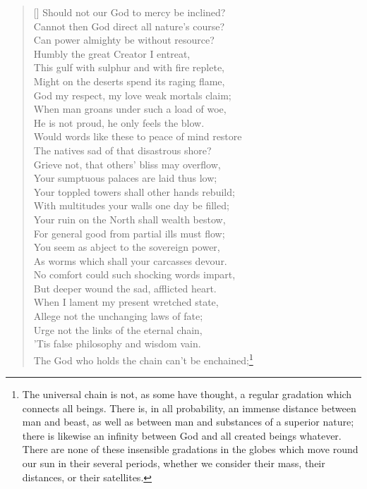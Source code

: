 \begin{verse}[\versewidth]
Should not our God to mercy be inclined?\\
Cannot then God direct all nature's course?\\
Can power almighty be without resource?\\
Humbly the great Creator I entreat,\\
This gulf with sulphur and with fire replete,\\
Might on the deserts spend its raging flame,\\
God my respect, my love weak mortals claim;\\
When man groans under such a load of woe,\\
He is not proud, he only feels the blow.\\
Would words like these to peace of mind restore\\
The natives sad of that disastrous shore?\\
Grieve not, that others' bliss may overflow,\\
Your sumptuous palaces are laid thus low;\\
Your toppled towers shall other hands rebuild;\\
With multitudes your walls one day be filled;\\
Your ruin on the North shall wealth bestow,\\
For general good from partial ills must flow;\\
You seem as abject to the sovereign power,\\
As worms which shall your carcasses devour.\\
No comfort could such shocking words impart,\\
But deeper wound the sad, afflicted heart.\\
When I lament my present wretched state,\\
Allege not the unchanging laws of fate;\\
Urge not the links of the eternal chain,\\
'Tis false philosophy and wisdom vain.\\
The God who holds the chain can't be enchained;\footnote{The
universal chain is not, as some have thought, a regular gradation
which connects all beings. There is, in all probability, an immense
distance between man and beast, as well as between man and substances
of a superior nature; there is likewise an infinity between God and
all created beings whatever. There are none of these insensible
gradations in the globes which move round our sun in their several
periods, whether we consider their mass, their distances, or their
satellites.

}
\end{verse}
